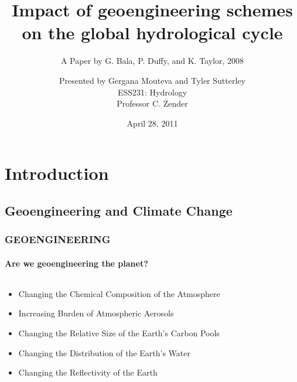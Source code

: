 \documentclass{beamer}
\title[Bala et al, {\it Proceedings of the National Academy of Sciences}, Vol. 105, No. 22 (2008)]
{Impact of geoengineering schemes on the global hydrological cycle}
\subtitle{A Paper by G. Bala, P. Duffy, and K. Taylor, 2008}
\author[Tyler Sutterley]{Presented by Gergana Mouteva and Tyler Sutterley\\\vspace{0.3cm}ESS231: Hydrology
\\Professor C. Zender}
\date[April 28, 2011]{April 28, 2011}
\begin{document}


\begin{frame}
  \titlepage
\end{frame}

\begin{frame}
	\tableofcontents
\end{frame}

\section{Introduction}
\subsection{Geoengineering and Climate Change}
\begin{frame}
\frametitle{GEOENGINEERING}
\framesubtitle{Are we geoengineering the planet?}
\begin{columns}
\begin{column}{6.25cm}
	\begin{itemize}
		\item Changing the Chemical Composition of the Atmosphere
		\item Increasing Burden of Atmospheric Aerosols
		\item Changing the Relative Size of the Earth's Carbon Pools
		\item Changing the Distribution of the Earth's Water
		\item Changing the Reflectivity of the Earth
	\end{itemize}
\end{column}
\begin{column}{6.25cm}
\begin{center}
\end{center}
\end{column}
\end{columns}
\end{frame}
\end{document}
